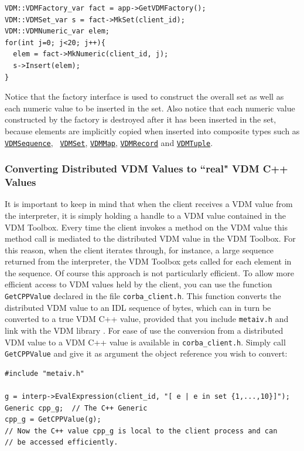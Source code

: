 \documentclass[\pformat,12pt]{article}
\newcommand{\Generic}{\hyperlink{interface.Generic}{Generic}}
\newcommand{\VDMMap}{\hyperlink{interface.VDMMap}{VDMMap}}
\newcommand{\VDMRecord}{\hyperlink{interface.VDMRecord}{VDMRecord}}
\newcommand{\VDMSequence}{\hyperlink{interface.VDMSequence}{VDMSequence}}
\newcommand{\VDMSet}{\hyperlink{interface.VDMSet}{VDMSet}}
\newcommand{\VDMTuple}{\hyperlink{interface.VDMTuple}{VDMTuple}}
\begin{document}
\begin{verbatim}
VDM::VDMFactory_var fact = app->GetVDMFactory();
VDM::VDMSet_var s = fact->MkSet(client_id);
VDM::VDMNumeric_var elem;
for(int j=0; j<20; j++){
  elem = fact->MkNumeric(client_id, j);
  s->Insert(elem);
}
\end{verbatim}

Notice that the factory interface is used to construct the overall set
as well as each numeric value to be inserted in the set. Also notice
that each numeric value constructed by the factory is destroyed after it has
been inserted in the set, because elements are implicitly copied when
inserted into composite types such as {\tt \VDMSequence}, {\tt
  \VDMSet}, {\tt \VDMMap}, {\tt \VDMRecord} and {\tt \VDMTuple}. 

\subsubsection{Converting Distributed VDM Values to ``real" VDM C++ Values}

It is important to keep in mind that when the client receives a VDM
value from the interpreter, it is simply holding a handle to a VDM 
value contained in the VDM Toolbox. Every time the client invokes a
method on the VDM value this method call is mediated to the
distributed VDM value in the VDM Toolbox. For this reason, when the
client iterates through, for instance, a large sequence returned from
the interpreter, the VDM Toolbox gets called for each element in the
sequence. Of course this approach is not particularly efficient. To
allow more efficient access to VDM values held by the client, you can
use 
the function {\tt GetCPPValue} declared in
the file \texttt{corba\_client.h}. This
function converts the distributed VDM value to an IDL sequence of
bytes, which can in turn be converted to a true VDM C++ value,
provided that you include {\tt metaiv.h} and link with the VDM
library \cite{LibMan-CSK}. For ease of use the conversion from a distributed VDM value
to a VDM C++ value is available in {\tt corba\_client.h}. Simply call
{\tt GetCPPValue} and give it as argument the object reference you
wish to convert:
\begin{verbatim}
#include "metaiv.h"

g = interp->EvalExpression(client_id, "[ e | e in set {1,...,10}]");
Generic cpp_g;  // The C++ Generic
cpp_g = GetCPPValue(g);
// Now the C++ value cpp_g is local to the client process and can
// be accessed efficiently. 
\end{verbatim}
\end{document}
